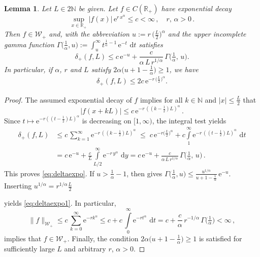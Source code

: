 \documentclass[11pt,a4paper]{scrartcl}
\renewcommand{\d}{\,\mathrm{d}}
\newtheorem{lemma}[theorem]{Lemma}
\numberwithin{equation}{section}
\numberwithin{table}{section}
\numberwithin{figure}{section}
\newcommand{\e}{\mathrm e}
\newcommand{\N}{\mathbb N}
\newcommand{\Rp}{{\mathbb R}_{+}}
\newcommand{\Wp}{{\mathcal W}_{+}}
\newcommand{\dpl}{\delta_{+}}
\begin{document}
\begin{lemma}
	\label{Lemma:expodecay}
	Let $L \in 2\N$ be given. Let $f \in C(\Rp)$ have \emph{exponential decay}
	$$
	\textstyle \sup\limits_{x \in \Rp} |f(x)|\,\e^{r\,x^{\alpha}}
	\leq c < \infty\,, \quad r,\, \alpha > 0\,.
	$$
	Then $f \in \Wp$ and, with the abbreviation $u := r\,\big(\frac{L}{2}\big)^{\alpha}$ and the
	upper incomplete gamma function $\Gamma\big(\tfrac{1}{\alpha},u\big) := \int_u^{\infty} t^{\frac{1}{\alpha}-1}\,\e^{-t}\,\d t$  satisfies
	\begin{equation}
		\label{eq:deltaexpo}
		\textstyle \dpl(f,L) \leq  c\,\e^{-u}   + \frac{c}{\alpha\,L\,r^{1/\alpha}}\,\Gamma\big(\tfrac{1}{\alpha},\,u\big).
	\end{equation}
In particular, if $\alpha$, $r$ and $L$ satisfy $2\alpha\big(u+1-\frac1\alpha\big)\ge 1$, we have
\begin{align}\label{eq:deltaexpo1}
\textstyle  \dpl(f,L) \leq  2c\,\e^{-r\, \big(\frac{L}{2}\big)^{\alpha}}.
\end{align}
\end{lemma}

\begin{proof} The assumed  exponential decay of $f$ implies for all $k \in \N$ and
$|x| \leq \frac{L}{2}$ that
$$
\textstyle \bigl|f(x + k L)\bigr| \leq c\,\e^{-r\,((k- \frac{1}{2})L)^{\alpha}}\,.
$$
Since $t \mapsto \e^{-r((t-\frac12)L)^{\alpha}}$ is decreasing on $[1,\infty)$, the
integral test yields
\begin{align*}
	\textstyle \dpl(f,L) &\leq \textstyle
	c\,\sum\limits_{k=1}^{\infty}\e^{-r\,((k- \frac{1}{2})L)^{\alpha}}
	\;\le\; \textstyle c\, \e^{-r \big(\frac{L}{2}\big)^\alpha} + c\int\limits_{1}^{\infty}\e^{-r\,((t-\frac12)L)^{\alpha}}\,\d t\\
	& = \textstyle c\,\e^{-u} + \frac{c}{L}\int\limits_{L/2}^{\infty}\e^{-r\,y^{\alpha}}\,\d y
	= c\,\e^{-u} + \frac{c}{\alpha\,L\,r^{1/\alpha}}\,\Gamma\big(\tfrac1\alpha,\,u\big)\,.
\end{align*}
This proves
\eqref{eq:deltaexpo}. If $u > \frac1\alpha - 1$, then \cite[Proposition 2.7]{Pi20} gives
$\Gamma\big(\frac1\alpha, u\big) \le \frac{u^{1/\alpha}}{u+1-\frac1\alpha}\,\e^{-u}$.
Inserting $u^{1/\alpha} = r^{1/\alpha}\frac{L}{2}$

yields \eqref{eq:deltaexpo1}.
In particular,
$$
\textstyle \| f\|_{\Wp} \leq c \,\sum\limits_{k=0}^{\infty} \e^{-r k^{\alpha}} \leq c + c\,\int\limits_0^{\infty} \e^{- r t^{\alpha}}\,\d t
	= c + \frac{c}{\alpha}\,r^{-1/\alpha}\,\Gamma\big(\tfrac{1}{\alpha}\big) < \infty\,,
$$
implies  that  $f \in \Wp$.
Finally, the condition $2\alpha\big(u+1-\frac1\alpha\big) \ge 1$ is satisfied for
sufficiently large $L$ and arbitrary $r$, $\alpha > 0$.
\end{proof}
\end{document}
